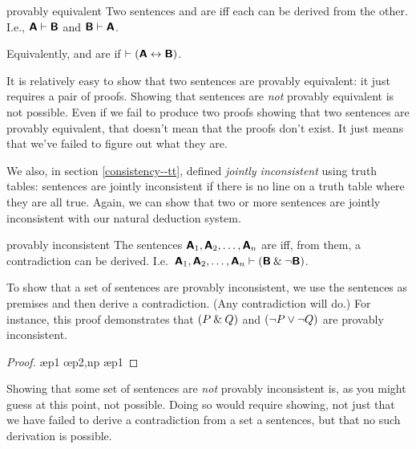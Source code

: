 {{{{{{{{{\begin{factboxy}{provably equivalent}
Two sentences  and  are  iff each can be derived from the other. I.e., $\bm{\mathsf{A}}\vdash\bm{\mathsf{B}}$ and $\bm{\mathsf{B}}\vdash\bm{\mathsf{A}}$.\medskip

Equivalently,  and  are  if $\vdash (\bm{\mathsf{A}} \leftrightarrow \bm{\mathsf{B}})$.
\end{factboxy}
        
It is relatively easy to show that two sentences are provably equivalent: it just requires a pair of proofs. Showing that sentences are \emph{not} provably equivalent is not possible. Even if we fail to produce two proofs showing that two sentences are provably equivalent, that doesn't mean that the proofs don't exist. It just means that we've failed to figure out what they are. 

We also, in section \ref{consistency--tt}, defined \textit{jointly inconsistent} using truth tables: sentences are jointly inconsistent if there is no line on a truth table where they are all true. Again, we can show that two or more sentences are jointly inconsistent with our natural deduction system. 

\begin{factboxy}{provably inconsistent}
The sentences $\bm{\mathsf{A}}_1,\bm{\mathsf{A}}_2,\ldots, \bm{\mathsf{A}}_n$ are  iff, from them, a contradiction can be derived. I.e.\ $\bm{\mathsf{A}}_1,\bm{\mathsf{A}}_2,\ldots, \bm{\mathsf{A}}_n \vdash (\bm{\mathsf{B}} \mathbin{\&} {\neg} \bm{\mathsf{B}})$.
\end{factboxy}
        
To show that a set of sentences are provably inconsistent, we use the sentences as premises and then derive a contradiction. (Any contradiction will do.) For instance, this proof demonstrates that $(P \mathbin{\&} Q)$ and $({\neg} P \vee {\neg} Q)$ are provably inconsistent.

	\begin{proof}
	 \pr{}
	 \pr{}
	 \ae{p1}
	 
	 \oe{p2,np}
	 \ae{p1}
	 
	\end{proof}

Showing that some set of sentences are \textit{not} provably inconsistent is, as you might guess at this point, not possible. Doing so would require showing, not just that we have failed to derive a contradiction from a set a sentences, but that no such derivation is possible.

}}}}}}}}}
